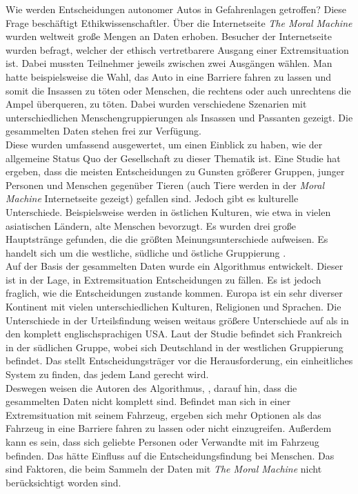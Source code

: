 Wie werden Entscheidungen autonomer Autos in Gefahrenlagen getroffen? Diese Frage beschäftigt Ethikwissenschaftler. Über die Internetseite \textit{The Moral Machine} wurden weltweit große Mengen an Daten erhoben. Besucher der Internetseite wurden befragt, welcher der ethisch vertretbarere Ausgang einer Extremsituation ist. Dabei mussten Teilnehmer jeweils zwischen zwei Ausgängen wählen. Man hatte beispielsweise die Wahl, das Auto in eine Barriere fahren zu lassen und somit die Insassen zu töten oder Menschen, die rechtens oder auch unrechtens die Ampel überqueren, zu töten. Dabei wurden verschiedene Szenarien mit unterschiedlichen Menschengruppierungen als Insassen und Passanten gezeigt. Die gesammelten Daten stehen frei zur Verfügung.\\

Diese wurden umfassend ausgewertet, um einen Einblick zu haben, wie der allgemeine Status Quo der Gesellschaft zu dieser Thematik ist. Eine Studie hat ergeben, dass die meisten Entscheidungen zu Gunsten größerer Gruppen, junger Personen und Menschen gegenüber Tieren (auch Tiere werden in der \textit{Moral Machine} Internetseite gezeigt) gefallen sind. Jedoch gibt es kulturelle Unterschiede. Beispielsweise werden in östlichen Kulturen, wie etwa in vielen asiatischen Ländern, alte Menschen bevorzugt. Es wurden drei große Hauptstränge gefunden, die die größten Meinungsunterschiede aufweisen. Es handelt sich um die westliche, südliche und östliche Gruppierung \cite{moralMachine}.\\

Auf der Basis der gesammelten Daten wurde ein Algorithmus \cite{votingBasedSystem} entwickelt. Dieser ist in der Lage, in Extremsituation Entscheidungen zu fällen. Es ist jedoch fraglich, wie die Entscheidungen zustande kommen. Europa ist ein sehr diverser Kontinent mit vielen unterschiedlichen Kulturen, Religionen und Sprachen. Die Unterschiede in der Urteilsfindung weisen weitaus größere Unterschiede auf als in den komplett englischsprachigen USA. Laut der Studie befindet sich Frankreich in der südlichen Gruppe, wobei sich Deutschland in der westlichen Gruppierung befindet. Das stellt Entscheidungsträger vor die Herausforderung, ein einheitliches System zu finden, das jedem Land gerecht wird.\\

Deswegen weisen die Autoren des Algorithmus, \citeauthor{votingBasedSystem}, darauf hin, dass die gesammelten Daten nicht komplett sind. Befindet man sich in einer Extremsituation mit seinem Fahrzeug, ergeben sich mehr Optionen als das Fahrzeug in eine Barriere fahren zu lassen oder nicht einzugreifen. Außerdem kann es sein, dass sich geliebte Personen oder Verwandte mit im Fahrzeug befinden. Das hätte Einfluss auf die Entscheidungsfindung bei Menschen. Das sind Faktoren, die beim Sammeln der Daten mit \textit{The Moral Machine} nicht berücksichtigt worden sind.\\

